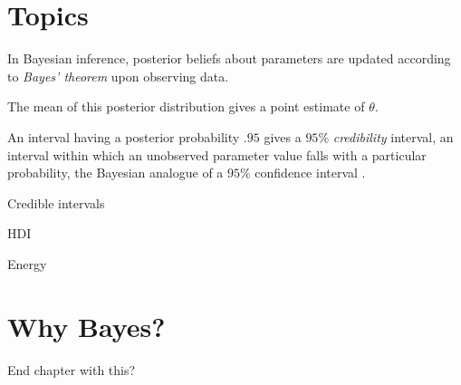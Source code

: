 \section{Topics} 

In Bayesian inference, posterior beliefs about parameters are updated according to \textit{Bayes' theorem} upon observing data.  

The mean of this posterior distribution gives a point estimate of $\theta$. 

An interval having a posterior probability $.95$ gives a $95\%$ \textit{credibility} interval, an interval within which an unobserved parameter value falls with a particular probability, the Bayesian analogue of a $95\%$ confidence interval \cite[p. 777]{STK}.

Credible intervals 

HDI 

Energy


\section{Why Bayes?}

End chapter with this?
